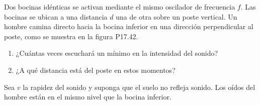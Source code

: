 \item Dos bocinas idénticas se activan mediante el mismo oscilador de frecuencia $f$. Las bocinas se ubican a una distancia $d$ una de otra sobre un poste vertical. Un hombre camina directo hacia la bocina inferior en una dirección perpendicular al poste, como se muestra en la figura P17.42.
\begin{enumerate}
    \item ¿Cuántas veces escuchará un mínimo en la intensidad del sonido?
    \item ¿A qué distancia está del poste en estos momentos?
\end{enumerate}
Sea $v$ la rapidez del sonido y suponga que el suelo no refleja sonido. Los oídos del hombre están en el mismo nivel que la bocina inferior.